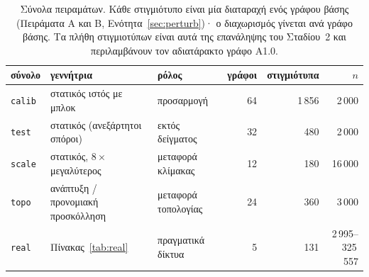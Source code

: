 \begin{table}[t]
\centering
\footnotesize
\caption{Σύνολα πειραμάτων. Κάθε στιγμιότυπο είναι μία διαταραχή ενός γράφου βάσης (Πειράματα Α και Β, Ενότητα~\ref{sec:perturb})· ο διαχωρισμός γίνεται ανά γράφο βάσης. Τα πλήθη στιγμιοτύπων είναι αυτά της επανάληψης του Σταδίου~2 και περιλαμβάνουν τον αδιατάρακτο γράφο A1.0.}
\label{tab:panels}
\begin{tabular}{@{}lllrrr@{}}
\toprule
σύνολο & γεννήτρια & ρόλος & γράφοι & στιγμιότυπα & $n$ \\
\midrule
\texttt{calib} & στατικός ιστός με μπλοκ & προσαρμογή & 64 & 1\,856 & 2\,000 \\
\texttt{test} & στατικός (ανεξάρτητοι σπόροι) & εκτός δείγματος & 32 & 480 & 2\,000 \\
\texttt{scale} & στατικός, $8\times$ μεγαλύτερος & μεταφορά κλίμακας & 12 & 180 & 16\,000 \\
\texttt{topo} & ανάπτυξη / προνομιακή προσκόλληση & μεταφορά τοπολογίας & 24 & 360 & 3\,000 \\
\texttt{real} & Πίνακας~\ref{tab:real} & πραγματικά δίκτυα & 5 & 131 & 2\,995--325\,557 \\
\bottomrule
\end{tabular}
\end{table}
